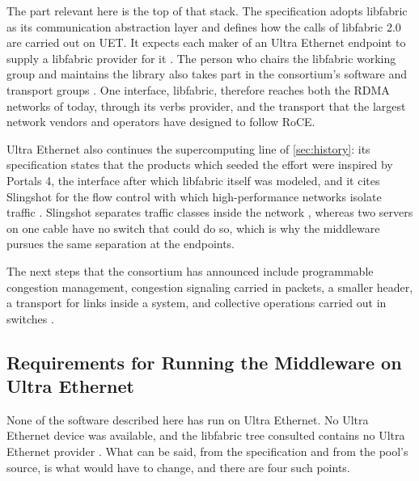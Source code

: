 The part relevant here is the top of that stack. The specification adopts
libfabric as its communication abstraction layer and defines how the calls of
libfabric 2.0 are carried out on UET. It expects each maker of an Ultra
Ethernet endpoint to supply a libfabric provider for it \citep{uecspec}. The
person who chairs the libfabric working group and maintains the library also
takes part in the consortium's software and transport groups
\citep{xiong2025ofaue}. One interface, libfabric, therefore reaches both the
RDMA networks of today, through its verbs provider, and the transport that
the largest network vendors and operators have designed to follow RoCE.

Ultra Ethernet also continues the supercomputing line of \cref{sec:history}:
its specification states that the products which seeded the effort were
inspired by Portals 4, the interface after which libfabric itself was
modeled, and it cites Slingshot for the flow control with which
high-performance networks isolate traffic \citep{uecspec}. Slingshot
separates traffic classes inside the network \citep{desensi2020slingshot},
whereas two servers on one cable have no switch that could do so, which is
why the middleware pursues the same separation at the endpoints.

The next steps that the consortium has announced include
programmable congestion management, congestion signaling carried in packets,
a smaller header, a transport for links inside a system, and collective
operations carried out in switches \citep{uec2024update,uec2025vision}.

\subsection{Requirements for Running the Middleware on Ultra Ethernet}
\label{sec:uec-port}

None of the software described here has run on Ultra Ethernet. No Ultra Ethernet device was
available, and the libfabric tree consulted contains no Ultra Ethernet provider \citep{libfabric_repo}. What can be said, from the
specification and from the pool's source, is what would have to change, and
there are four such points.

